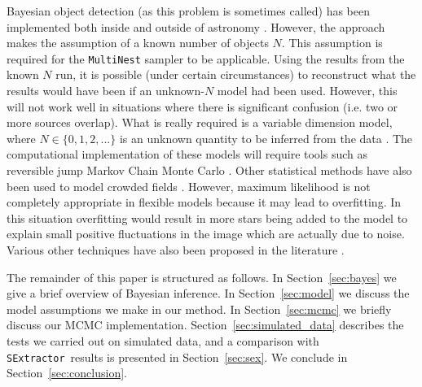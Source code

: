\documentclass[12pt, preprint]{aastex}
\newcommand{\sex}{{\tt SExtractor}}
\begin{document}
Bayesian object detection (as this problem is sometimes called) has been
implemented both inside and outside of astronomy
\citep[e.g.][]{object, 2003MNRAS.338..765H, 2011MNRAS.415.3462F}. However, the
\citet{2011MNRAS.415.3462F} approach makes the assumption of a
known number of objects $N$.
This assumption is required for the
{\tt MultiNest} sampler \citep{multinest} to be applicable.
Using the results from the known $N$
run, it is possible (under certain circumstances) to reconstruct what the
results would have been if an unknown-$N$ model had been used. However,
this will not work well in situations where there is significant confusion
(i.e. two or more sources overlap). What is really required is a variable
dimension model, where $N \in \{0, 1, 2, ... \}$ is an unknown quantity to be
inferred from the data \citep[e.g.][]{2003MNRAS.338..765H}.
The computational implementation of these models will require tools such as
reversible jump Markov Chain Monte Carlo \citep{rjmcmc}. Other statistical
methods have also been used to model crowded fields
\citep[e.g. maximum likelihood,][]{irwin}.
However, maximum likelihood is not completely appropriate in flexible models
because it may lead to overfitting. In this situation overfitting would result
in more stars being added to the model to explain small positive fluctuations
in the image which are actually due to noise. Various other techniques have
also been proposed in the literature \citep[e.g.][]{2002MNRAS.335...73M, 2007A&A...461..373M, 2009PASP..121.1429Z}.

The remainder of this paper is structured as follows. In Section~\ref{sec:bayes}
we give a brief overview of Bayesian inference. In Section~\ref{sec:model} we
discuss the model assumptions we make in our method. In Section~\ref{sec:mcmc}
we briefly discuss our
MCMC implementation. Section~\ref{sec:simulated_data} describes the tests we
carried out on simulated data, and a comparison with \sex~results is presented
in Section~\ref{sec:sex}. We conclude in Section~\ref{sec:conclusion}.
\end{document}

